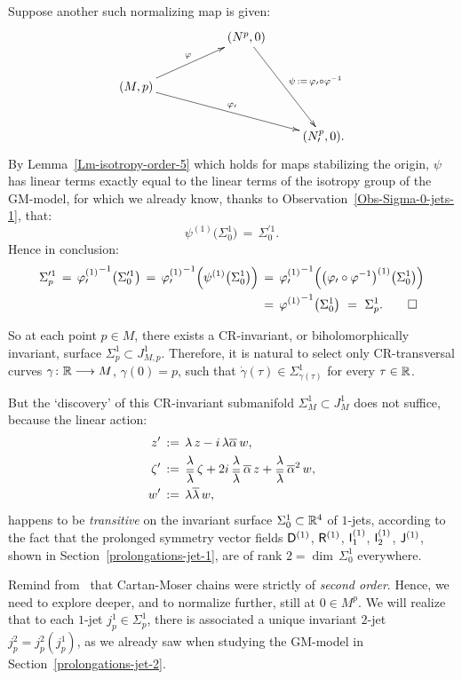 \documentclass[12pt,twoside,leqno,openany]{amsart}
\begin{document}
\proof
Suppose another such normalizing map is given:
\[
\xymatrix{
& &
(N^p,0)
\ar[ddr]^{\psi\,:=\,\varphi_\prime\circ\varphi^{-1}}
\\
(M,p)
\ar[rru]^{\varphi}
\ar[rrrd]^{\varphi_\prime}
&
&
&
\\
& & &
(N_\prime^p,0).
}
\]
By Lemma~{\ref{Lm-isotropy-order-5}}
which holds for maps stabilizing the origin,
$\psi$ has linear terms exactly equal to the linear
terms of the isotropy group of the GM-model, for
which we already know, thanks to 
Observation~{\ref{Obs-Sigma-0-jets-1}}, that:
\[
\psi^{(1)}
\big(
\Sigma_0^1
\big)
\,=\,
\Sigma_0^{\prime1}.
\]
Hence in conclusion:
\begin{align*}
\Sigma_p^{\prime1}
\,=\,
{\varphi_\prime^{(1)}}^{-1}
\big(
\Sigma_0^{\prime1}
\big)
\,=\,
{\varphi_\prime^{(1)}}^{-1}
\Big(
\psi^{(1)}
\big(
\Sigma_0^1
\big)
\Big)
&
\,=\,
{\varphi_\prime^{(1)}}^{-1}
\Big(
\big(
\varphi_\prime
\circ
\varphi^{-1}
\big)^{(1)}
\big(
\Sigma_0^1
\big)
\Big)
\\
&
\,=\,
{\varphi^{(1)}}^{-1}
\big(
\Sigma_0^1
\big)
\,\,=\,\,
\Sigma_p^1.
\qedhere
\end{align*}
\endproof

So at each point $p \in M$, there exists a CR-invariant,
or biholomorphically invariant,
surface $\Sigma_p^1 \subset J_{M,p}^1$.
Therefore, it is natural to select only
CR-transversal curves $\gamma \colon \mathbb{R} \longrightarrow
M$, $\gamma(0) = p$, such that $\dot{\gamma}(\tau) 
\in \Sigma_{\gamma(\tau)}^1$ for every $\tau \in \mathbb{R}$.

But the `discovery' of this CR-invariant submanifold
$\Sigma_M^1 \subset J_M^1$ 
does not suffice, because the linear action:
\[
\aligned
z'
&
\,:=\,
\lambda\,z
-
i\,\lambda\overline{\alpha}\,w,
\\
\zeta'
&
\,:=\,
\frac{\lambda}{\overline{\lambda}}\,
\zeta
+
2i\,\frac{\lambda}{\overline{\lambda}}\,\overline{\alpha}\,
z
+
\frac{\lambda}{\overline{\lambda}}\,\overline{\alpha}^2\,
w,
\\
w'
&
\,:=\,
\lambda\overline{\lambda}\,
w,
\endaligned
\]
happens to be {\em transitive} on the invariant surface
$\Sigma_0^1 \subset \mathbb{R}^4$ of $1$-jets, according to the fact
that the prolonged
symmetry vector fields 
${\sf D}^{(1)}$, ${\sf R}^{(1)}$, ${\sf I}_1^{(1)}$,
${\sf I}_2^{(1)}$, ${\sf J}^{(1)}$,
shown in Section~{\ref{prolongations-jet-1}},
are of rank $2 = \dim\, \Sigma_0^1$ everywhere.

Remind from~{\cite{Cartan-1932-I, Cartan-1932-II, 
Jacobowitz-1990, Merker-2020}}
that Cartan-Moser chains were 
strictly of {\em second order}.
Hence, we need to explore deeper, 
and to normalize further, still at $0 \in M^p$.
We will realize that to each $1$-jet
$j_p^1 \in \Sigma_p^1$,
there is associated a unique invariant $2$-jet
$j_p^2 = j_p^2 ( j_p^1)$, as we already saw when
studying the GM-model in 
Section~{\ref{prolongations-jet-2}}.
\end{document}
